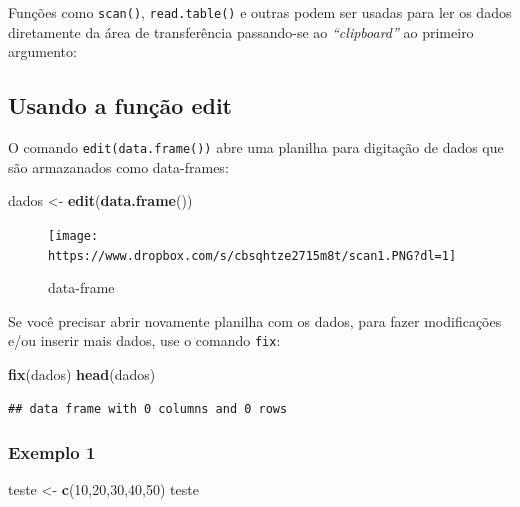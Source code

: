 \documentclass[
]{book}
\newenvironment{Shaded}{\begin{snugshade}}{\end{snugshade}}
\newcommand{\DecValTok}[1]{\textcolor[rgb]{0.00,0.00,0.81}{#1}}
\newcommand{\KeywordTok}[1]{\textcolor[rgb]{0.13,0.29,0.53}{\textbf{#1}}}
\newcommand{\NormalTok}[1]{#1}
\newcommand{\StringTok}[1]{\textcolor[rgb]{0.31,0.60,0.02}{#1}}
\begin{document}
Funções como \texttt{scan()}, \texttt{read.table()} e outras podem ser usadas para ler os dados diretamente da área de transferência passando-se ao \emph{``clipboard''} ao primeiro argumento:

\hypertarget{usando-a-funuxe7uxe3o-edit}{%
\subsection{Usando a função edit}\label{usando-a-funuxe7uxe3o-edit}}

O comando \texttt{edit(data.frame())} abre uma planilha para digitação de dados que são armazanados como data-frames:

\begin{Shaded}
\begin{Highlighting}[]
\NormalTok{dados <-}\StringTok{ }\KeywordTok{edit}\NormalTok{(}\KeywordTok{data.frame}\NormalTok{())}
\end{Highlighting}
\end{Shaded}

\begin{figure}
\centering
\texttt{[image: https://www.dropbox.com/s/cbsqhtze2715m8t/scan1.PNG?dl=1]}
\caption{data-frame}
\end{figure}

Se você precisar abrir novamente planilha com os dados, para fazer modificações e/ou inserir mais dados, use o comando \texttt{fix}:

\begin{Shaded}
\begin{Highlighting}[]
\KeywordTok{fix}\NormalTok{(dados)}
\KeywordTok{head}\NormalTok{(dados)}
\end{Highlighting}
\end{Shaded}

\begin{verbatim}
## data frame with 0 columns and 0 rows
\end{verbatim}

\hypertarget{exemplo-1}{%
\subsubsection{Exemplo 1}\label{exemplo-1}}

\begin{Shaded}
\begin{Highlighting}[]
\NormalTok{teste <-}\StringTok{ }\KeywordTok{c}\NormalTok{(}\DecValTok{10}\NormalTok{,}\DecValTok{20}\NormalTok{,}\DecValTok{30}\NormalTok{,}\DecValTok{40}\NormalTok{,}\DecValTok{50}\NormalTok{)}
\NormalTok{teste}
\end{Highlighting}
\end{Shaded}
\end{document}
